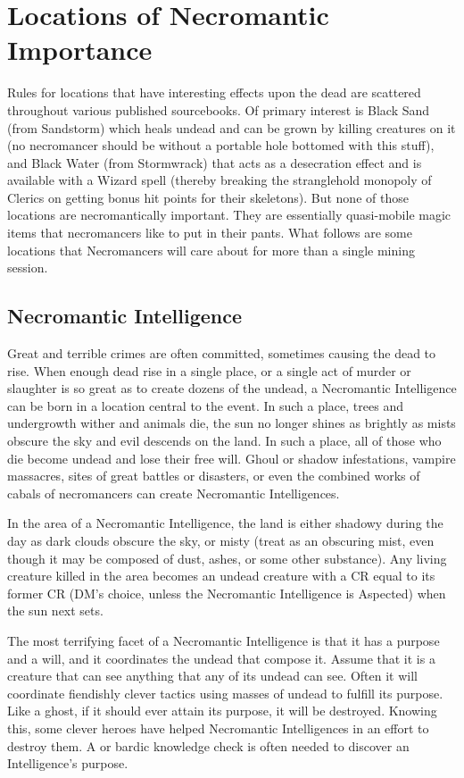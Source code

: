 \section{Locations of Necromantic Importance}

Rules for locations that have interesting effects upon the dead are scattered throughout various published sourcebooks. Of primary interest is Black Sand (from Sandstorm) which heals undead and can be grown by killing creatures on it (no necromancer should be without a portable hole bottomed with this stuff), and Black Water (from Stormwrack) that acts as a desecration effect and is available with a Wizard spell (thereby breaking the stranglehold monopoly of Clerics on getting bonus hit points for their skeletons). But none of those locations are necromantically important. They are essentially quasi-mobile magic items that necromancers like to put in their pants. What follows are some locations that Necromancers will care about for more than a single mining session.

\subsection{Necromantic Intelligence}

Great and terrible crimes are often committed, sometimes causing the dead to rise. When enough dead rise in a single place, or a single act of murder or slaughter is so great as to create dozens of the undead, a Necromantic Intelligence can be born in a location central to the event. In such a place, trees and undergrowth wither and animals die, the sun no longer shines as brightly as mists obscure the sky and evil descends on the land. In such a place, all of those who die become undead and lose their free will. Ghoul or shadow infestations, vampire massacres, sites of great battles or disasters, or even the combined works of cabals of necromancers can create Necromantic Intelligences.

In the area of a Necromantic Intelligence, the land is either shadowy during the day as dark clouds obscure the sky, or misty (treat as an obscuring mist, even though it may be composed of dust, ashes, or some other substance). Any living creature killed in the area becomes an undead creature with a CR equal to its former CR (DM's choice, unless the Necromantic Intelligence is Aspected) when the sun next sets.

The most terrifying facet of a Necromantic Intelligence is that it has a purpose and a will, and it coordinates the undead that compose it. Assume that it is a creature that can see anything that any of its undead can see. Often it will coordinate fiendishly clever tactics using masses of undead to fulfill its purpose. Like a ghost, if it should ever attain its purpose, it will be destroyed. Knowing this, some clever heroes have helped Necromantic Intelligences in an effort to destroy them. A  or bardic knowledge check is often needed to discover an Intelligence's purpose.

